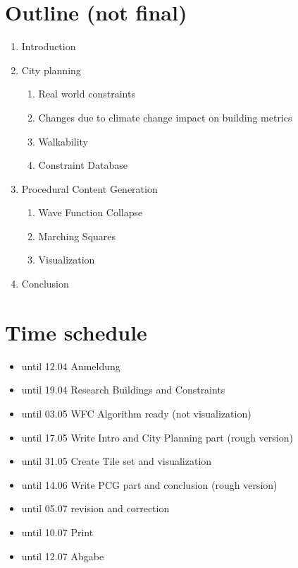\section{Outline (not final)}
\begin{enumerate}
    \item Introduction
    \item City planning
    \begin{enumerate}
        \item Real world constraints
        \item Changes due to climate change impact on building metrics
        \item Walkability
        \item Constraint Database
    \end{enumerate}
    \item Procedural Content Generation
    \begin{enumerate}
        \item Wave Function Collapse
        \item Marching Squares
        \item Visualization
    \end{enumerate}
    \item Conclusion
\end{enumerate}

\section{Time schedule}
\begin{itemize}
    \item until 12.04 Anmeldung
    \item until 19.04 Research Buildings and Constraints
    \item until 03.05 WFC Algorithm ready (not visualization)
    \item until 17.05 Write Intro and City Planning part (rough version)
    \item until 31.05 Create Tile set and visualization
    \item until 14.06 Write PCG part and conclusion (rough version)
    \item until 05.07 revision and correction
    \item until 10.07 Print
    \item until 12.07 Abgabe 
\end{itemize}




